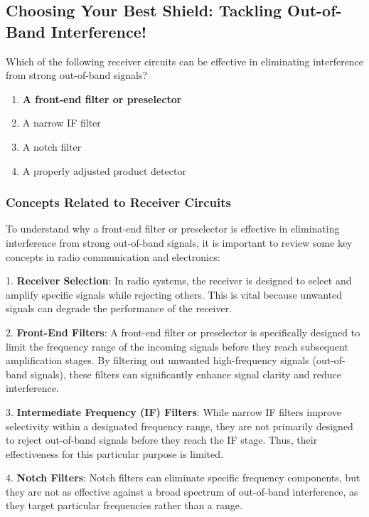 \subsection{Choosing Your Best Shield: Tackling Out-of-Band Interference!}

\begin{tcolorbox}[colback=gray!10, colframe=black, title=E4C02] Which of the following receiver circuits can be effective in eliminating interference from strong out-of-band signals?
\begin{enumerate}[label=\Alph*.]
    \item \textbf{A front-end filter or preselector}
    \item A narrow IF filter
    \item A notch filter
    \item A properly adjusted product detector
\end{enumerate} \end{tcolorbox}

\subsubsection{Concepts Related to Receiver Circuits}

To understand why a front-end filter or preselector is effective in eliminating interference from strong out-of-band signals, it is important to review some key concepts in radio communication and electronics:

1. \textbf{Receiver Selection}: In radio systems, the receiver is designed to select and amplify specific signals while rejecting others. This is vital because unwanted signals can degrade the performance of the receiver.

2. \textbf{Front-End Filters}: A front-end filter or preselector is specifically designed to limit the frequency range of the incoming signals before they reach subsequent amplification stages. By filtering out unwanted high-frequency signals (out-of-band signals), these filters can significantly enhance signal clarity and reduce interference.

3. \textbf{Intermediate Frequency (IF) Filters}: While narrow IF filters improve selectivity within a designated frequency range, they are not primarily designed to reject out-of-band signals before they reach the IF stage. Thus, their effectiveness for this particular purpose is limited.

4. \textbf{Notch Filters}: Notch filters can eliminate specific frequency components, but they are not as effective against a broad spectrum of out-of-band interference, as they target particular frequencies rather than a range.

